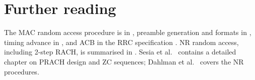 \documentclass[11pt,a4paper]{article}
\begin{document}
\section{Further reading}
The MAC random access procedure is in \cite{ts36321}, preamble generation and formats in \cite{ts36211},
timing advance in \cite{ts36213}, and ACB in the RRC specification \cite{ts36331}. NR random access,
including 2-step RACH, is summarised in \cite{ts38300}. Sesia et al.\ \cite{sesia2011lte} contains a detailed
chapter on PRACH design and ZC sequences; Dahlman et al.\ \cite{dahlman2020nr} covers the NR procedures.

\printbibliography[heading=subbibliography,title={\ACNstrRefs}]
\end{document}
